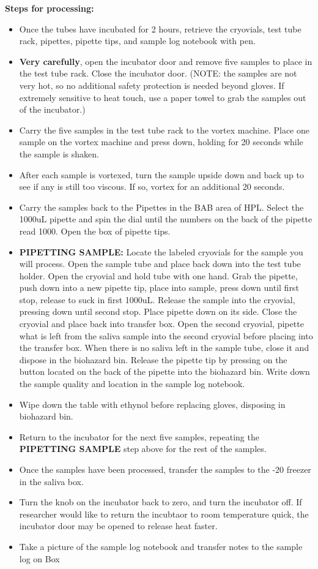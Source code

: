 \documentclass[]{book}
\providecommand{\tightlist}{%
  \setlength{\itemsep}{0pt}\setlength{\parskip}{0pt}}
\begin{document}
\textbf{Steps for processing:}

\begin{itemize}
\tightlist
\item
  Once the tubes have incubated for 2 hours, retrieve the cryovials, test tube rack, pipettes, pipette tips, and sample log notebook with pen.
\item
  \textbf{Very carefully}, open the incubator door and remove five samples to place in the test tube rack. Close the incubator door. (NOTE: the samples are not very hot, so no additional safety protection is needed beyond gloves. If extremely sensitive to heat touch, use a paper towel to grab the samples out of the incubator.)
\item
  Carry the five samples in the test tube rack to the vortex machine. Place one sample on the vortex machine and press down, holding for 20 seconds while the sample is shaken.
\item
  After each sample is vortexed, turn the sample upside down and back up to see if any is still too viscous. If so, vortex for an additional 20 seconds.
\item
  Carry the samples back to the Pipettes in the BAB area of HPL. Select the 1000uL pipette and spin the dial until the numbers on the back of the pipette read 1000. Open the box of pipette tips.
\item
  \textbf{PIPETTING SAMPLE:} Locate the labeled cryovials for the sample you will process. Open the sample tube and place back down into the test tube holder. Open the cryovial and hold tube with one hand. Grab the pipette, push down into a new pipette tip, place into sample, press down until first stop, release to suck in first 1000uL. Release the sample into the cryovial, pressing down until second stop. Place pipette down on its side. Close the cryovial and place back into transfer box. Open the second cryovial, pipette what is left from the saliva sample into the second cryovial before placing into the transfer box. When there is no saliva left in the sample tube, close it and dispose in the biohazard bin. Release the pipette tip by pressing on the button located on the back of the pipette into the biohazard bin. Write down the sample quality and location in the sample log notebook.
\item
  Wipe down the table with ethynol before replacing gloves, disposing in biohazard bin.
\item
  Return to the incubator for the next five samples, repeating the \textbf{PIPETTING SAMPLE} step above for the rest of the samples.
\item
  Once the samples have been processed, transfer the samples to the -20 freezer in the saliva box.
\item
  Turn the knob on the incubator back to zero, and turn the incubator off. If researcher would like to return the incubtaor to room temperature quick, the incubator door may be opened to release heat faster.
\item
  Take a picture of the sample log notebook and transfer notes to the sample log on Box
\end{itemize}
\end{document}
